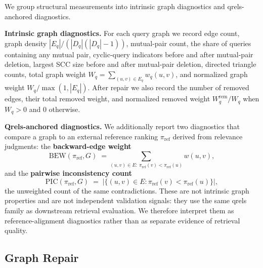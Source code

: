 \documentclass[manuscript,anonymous,review]{acmart}
\begin{document}
We group structural measurements into intrinsic graph diagnostics and
qrels-anchored diagnostics.

\textbf{Intrinsic graph diagnostics.} For each query graph we record edge
count, graph density $|E_q|/(|D_q|(|D_q|-1))$, mutual-pair count, the share of
queries containing any mutual pair, cyclic-query indicators before and after
mutual-pair deletion, largest SCC size before and after mutual-pair deletion,
directed triangle counts, total graph weight
$W_q=\sum_{(u,v)\in E_q} w_q(u,v)$, and normalized graph weight
$W_q/\max(1,|E_q|)$. After repair we also record the number of removed edges,
their total removed weight, and normalized removed weight
$W_q^{\mathrm{rem}}/W_q$ when $W_q>0$ and $0$ otherwise.

\textbf{Qrels-anchored diagnostics.} We additionally report two diagnostics
that compare a graph to an external reference ranking $\pi_{\mathrm{ref}}$
derived from relevance judgments: the \textbf{backward-edge weight}
\begin{equation}
  \mathrm{BEW}(\pi_{\mathrm{ref}}, G) \;=\!\! \sum_{(u,v)\in E:\ \pi_{\mathrm{ref}}(v) < \pi_{\mathrm{ref}}(u)} \!\! w(u,v),
  \label{eq:bew}
\end{equation}
and the \textbf{pairwise inconsistency count}
\begin{equation}
  \mathrm{PIC}(\pi_{\mathrm{ref}}, G) \;=\; \bigl|\{(u,v)\in E : \pi_{\mathrm{ref}}(v) < \pi_{\mathrm{ref}}(u)\}\bigr|,
  \label{eq:pic}
\end{equation}
the unweighted count of the same contradictions. These are not intrinsic graph
properties and are not independent validation signals: they use the same qrels
family as downstream retrieval evaluation. We therefore interpret them as
reference-alignment diagnostics rather than as separate evidence of retrieval
quality.

\subsection{Graph Repair}
\label{sec:repair}
\end{document}
